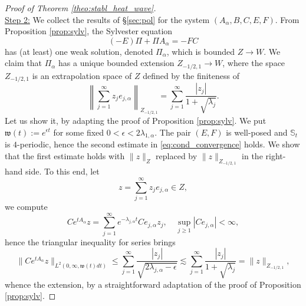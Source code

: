 \documentclass[10pt]{article}
\begin{document}
\begin{proof}[Proof of Theorem \ref{theo:stabl_heat_wave}]
\[\]
\underline{Step 2:} We collect the results of \S \ref{sec:pol} for the system $(A_\alpha,B,C,E,F)$. \newline
\newline
From Proposition \ref{prop:sylv}, the Sylvester equation 
\[
(-E)\Pi + \Pi A_\alpha = -FC
\]
has (at least) one weak solution, denoted $\Pi_\alpha$, which is bounded $Z \to W$. We claim that $\Pi_\alpha$ has a unique bounded extension $Z_{-1/2,1} \to W$, where the space $Z_{-1/2,1}$ is an extrapolation space of $Z$ defined by the finiteness of
\[
\left\| \sum_{j=1}^\infty z_j e_{j,\alpha} \right\|_{Z_{-1/2,1}} = \sum_{j=1}^\infty \frac{|z_j|}{1+ \sqrt{\lambda_j}}.
\]
Let us show it, by adapting the proof of Proposition \ref{prop:sylv}. We put $\mathfrak{w}(t) := e^{\epsilon t}$ for some fixed $0 < \epsilon < 2\lambda_{1,\alpha}$. The pair $(E,F)$ is well-posed and $\mathbb{S}_t$ is $4$-periodic, hence the second estimate in \eqref{eq:cond_convergence} holds. We show that the first estimate holds with $\|z\|_Z$ replaced by $\| z \|_{Z_{-1/2,1}}$ in the right-hand side. To this end, let 
\[
z = \sum_{j=1}^\infty z_j e_{j,\alpha} \in Z,
\]
we compute 
\[
C e^{tA_\alpha} z = \sum_{j=1}^\infty e^{-\lambda_{j,\alpha}t} C e_{j,\alpha} z_j, \quad \sup_{j \geq 1} |C e_{j,\alpha} | < \infty,
\]
hence the triangular inequality for series brings 
\begin{equation}\label{eq:meilleur_estimee_analytic}
\| C e^{tA_\alpha}z  \|_{L^2(0,\infty, \mathfrak{w}(t) dt)} \leq \sum_{j=1}^\infty \frac{|z_j|}{\sqrt{2\lambda_{j,\alpha}-\epsilon}} \lesssim \sum_{j=1}^\infty \frac{|z_j|}{1+ \sqrt{\lambda_j}}  = \|z \|_{Z_{-1/2,1}},    
\end{equation}
whence the extension, by a straightforward adaptation of the proof of Proposition \ref{prop:sylv}. 


\end{proof}
\end{document}
